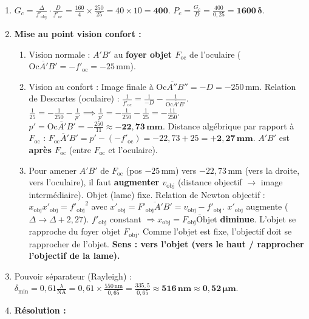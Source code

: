 \documentclass[11pt]{article}
\begin{document}
\begin{corrige}
\begin{enumerate}
    \item $G_c = \frac{\Delta}{f'_{\text{obj}}} \cdot \frac{D}{f'_{\text{oc}}} = \frac{160}{4} \times \frac{250}{25} = 40 \times 10 = \mathbf{400}$.
    $P_c = \frac{G_c}{D} = \frac{400}{0,25} = \mathbf{1600\,\delta}$.
    \item \textbf{Mise au point vision confort :}
    \begin{enumerate}
        \item Vision normale : $A'B'$ au \textbf{foyer objet $F_{\text{oc}}$} de l'oculaire ($\overline{\text{Oc}A'B'} = -f'_{\text{oc}} = -25\,\text{mm}$).
        \item Vision au confort : Image finale à $\overline{\text{Oc}A''B''} = -D = -250\,\text{mm}$.
        Relation de Descartes (oculaire) : $\frac{1}{f'_{\text{oc}}} = \frac{1}{-D} - \frac{1}{\overline{\text{Oc}A'B'}}$.
        $\frac{1}{25} = -\frac{1}{250} - \frac{1}{p'} \implies \frac{1}{p'} = -\frac{1}{250} - \frac{1}{25} = -\frac{11}{250}$.
        $p' = \overline{\text{Oc}A'B'} = -\frac{250}{11} \approx \mathbf{-22,73\,\text{mm}}$.
        Distance algébrique par rapport à $F_{\text{oc}}$ : $\overline{F_{\text{oc}}A'B'} = p' - (-f'_{\text{oc}}) = -22,73 + 25 = \mathbf{+2,27\,\text{mm}}$.
        $A'B'$ est \textbf{après $F_{\text{oc}}$} (entre $F_{\text{oc}}$ et l'oculaire).
        \item Pour amener $A'B'$ de $F_{\text{oc}}$ (pos $-25\,\text{mm}$) vers $-22,73\,\text{mm}$ (vers la droite, vers l'oculaire), il faut \textbf{augmenter $v_{\text{obj}}$} (distance objectif $\to$ image intermédiaire).
        Objet (lame) fixe. Relation de Newton objectif : $x_{\text{obj}} x'_{\text{obj}} = {f'_{\text{obj}}}^2$ avec $x'_{\text{obj}} = \overline{F'_{\text{obj}}A'B'} = v_{\text{obj}} - f'_{\text{obj}}$.
        $x'_{\text{obj}}$ augmente ($\Delta \to \Delta+2,27$). $f'_{\text{obj}}$ constant $\Rightarrow x_{\text{obj}} = \overline{F_{\text{obj}}\text{Objet}}$ \textbf{diminue}.
        L'objet se rapproche du foyer objet $F_{\text{obj}}$. Comme l'objet est fixe, l'objectif doit se rapprocher de l'objet.
        \textbf{Sens : vers l'objet (vers le haut / rapprocher l'objectif de la lame).}
    \end{enumerate}
    \item Pouvoir séparateur (Rayleigh) :
    $\delta_{\text{min}} = 0,61 \frac{\lambda}{\text{NA}} = 0,61 \times \frac{550\,\text{nm}}{0,65} = \frac{335,5}{0,65} \approx \mathbf{516\,\text{nm}} \approx \mathbf{0,52\,\mu\text{m}}$.
    \item \textbf{Résolution :}

\end{enumerate}
\end{corrige}
\end{document}
